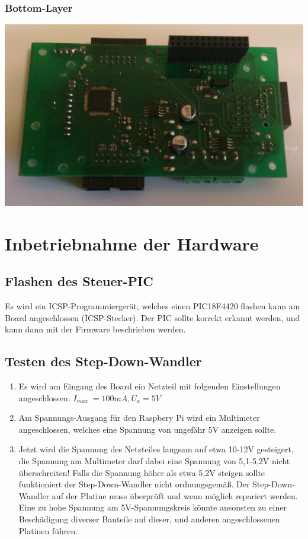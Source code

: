 \documentclass[a4paper,10pt]{article}
\begin{document}
\subsubsection{Bottom-Layer}

\includegraphics[width=\textwidth]{pointhiboard_board_bottom} \\

\newpage

\section{Inbetriebnahme der Hardware}

\subsection{Flashen des Steuer-PIC}

Es wird ein ICSP-Programmiergerät, welches einen PIC18F4420 flashen kann am Board angeschlossen (ICSP-Stecker). Der PIC sollte korrekt erkannt werden, und kann dann mit der Firmware beschrieben werden.

\subsection{Testen des Step-Down-Wandler}

\begin{enumerate}
 \item Es wird am Eingang des Board ein Netzteil mit folgenden Einstellungen angeschlossen: $I_{max} ~= 100mA, U_a = 5V$
 \item Am Spannungs-Ausgang für den Raspbery Pi wird ein Multimeter angeschlossen, welches eine Spannung von ungefähr 5V anzeigen sollte.
 \item Jetzt wird die Spannung des Netzteiles langsam auf etwa 10-12V gesteigert, die Spannung am Multimeter darf dabei eine Spannung von 5,1-5,2V nicht überschreiten!
Falls die Spannung höher als etwa 5,2V steigen sollte funktioniert der Step-Down-Wandler nicht ordnungsgemäß. Der Step-Down-Wandler auf der Platine muss überprüft und wenn möglich repariert werden. Eine zu hohe Spannung am 5V-Spannungskreis könnte ansonsten zu einer Beschädigung diverser Bauteile auf dieser, und anderen angeschlossenen Platinen führen.
\end{enumerate}
\end{document}
